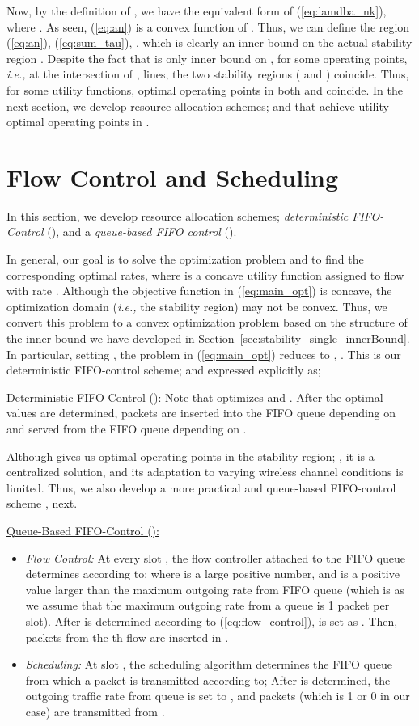 \documentclass[conference]{IEEEtran}
\newcommand{\ie}{{\em i.e., }}
\begin{document}
Now, by the definition of  , we have the equivalent form
 of (\ref{eq:lamdba_nk}), where . As seen, (\ref{eq:an}) is a convex function of . 
Thus, we can define the region  (\ref{eq:an}), (\ref{eq:sum_tau}),  , which is clearly an inner bound on the actual stability region . 
Despite the fact that  is only inner bound on , for some operating points, \ie at the intersection of  ,  lines, the two stability regions ( and ) coincide. Thus, for some utility functions, optimal operating points in both  and  coincide.
In the next section, we develop resource allocation schemes;  and  that achieve utility optimal operating points in .



\section{Flow Control and Scheduling} \label{sec:oFC_qFC}
In this section, we develop resource allocation schemes; {\em deterministic FIFO-Control} (), and a {\em queue-based FIFO control} (). 

In general, our goal is to solve the optimization problem
 and to find the corresponding optimal rates,  where  is a concave utility function assigned to flow with rate . 
Although the objective function  in (\ref{eq:main_opt}) is concave, the optimization domain  (\ie the stability region) may not be convex. Thus, we convert this problem to a convex optimization problem based on the structure of the inner bound we have developed in Section~\ref{sec:stability_single_innerBound}. 
In particular, setting , the problem in (\ref{eq:main_opt}) reduces to     , . This is our deterministic FIFO-control scheme;  and expressed explicitly as;

\underline{Deterministic FIFO-Control ():}
 Note that  optimizes  and . After the optimal values are determined, 
packets are inserted into the FIFO queue  depending on  and served from the FIFO queue  depending on . 

Although  gives us optimal operating points in the stability region; , it is a centralized solution, and its adaptation to varying wireless channel conditions is limited. Thus, we also develop a more practical and queue-based FIFO-control scheme , next. 

\underline{Queue-Based FIFO-Control ():}
\begin{itemize} 
\item {\em Flow Control:} At every slot , the flow controller attached to the FIFO queue  determines  according to; 
 where  is a large positive number, and  is a positive value larger than the maximum outgoing rate from FIFO queue  (which is  as we assume that the maximum outgoing rate from a queue is 1 packet per slot). After  is determined according to (\ref{eq:flow_control}),  is set as    . Then,  packets from the th flow are inserted in . 
\item {\em Scheduling:} At slot , the scheduling algorithm determines the FIFO queue from which a packet is transmitted according to;
 After  is determined, the outgoing traffic rate from queue  is set to       , and  packets (which is 1 or 0 in our case) are transmitted from . 
\end{itemize}
\end{document}
